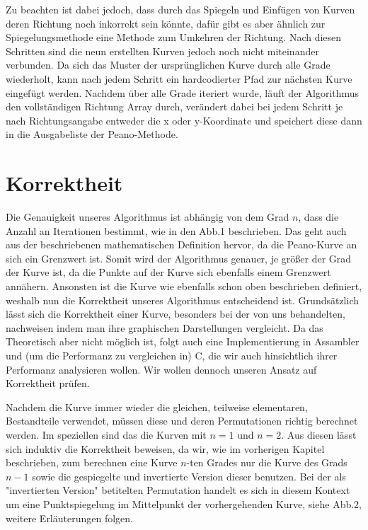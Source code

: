 \documentclass[course=asp]{aspdoc}
\begin{document}
Zu beachten ist dabei jedoch, dass durch das Spiegeln und Einfügen von Kurven deren Richtung noch inkorrekt sein könnte, dafür gibt es aber ähnlich zur Spiegelungsmethode eine Methode zum Umkehren der Richtung. Nach diesen Schritten sind die neun erstellten Kurven jedoch noch nicht miteinander verbunden. Da sich das Muster der ursprünglichen Kurve durch alle Grade wiederholt, kann nach jedem Schritt ein hardcodierter Pfad zur nächsten Kurve eingefügt werden.
Nachdem über alle Grade iteriert wurde, läuft der Algorithmus den vollständigen Richtung Array durch, verändert dabei bei jedem Schritt je nach Richtungsangabe entweder die x oder y-Koordinate und speichert diese dann in die Ausgabeliste der Peano-Methode.

\newpage

\section{Korrektheit} %

Die Genauigkeit unseres Algorithmus ist abhängig von dem Grad $n$, dass die Anzahl an Iterationen bestimmt, wie in den Abb.1 beschrieben. Das geht auch aus der beschriebenen mathematischen Definition hervor, da die Peano-Kurve an sich ein Grenzwert ist. Somit wird der Algorithmus genauer, je größer der Grad der Kurve ist, da die Punkte auf der Kurve sich ebenfalls einem Grenzwert annähern. Ansonsten ist die Kurve wie ebenfalls schon oben beschrieben definiert, weshalb nun die Korrektheit unseres Algorithmus entscheidend ist.
Grundsätzlich lässt sich die Korrektheit einer Kurve, besonders bei der von uns behandelten, nachweisen indem man ihre graphischen Darstellungen vergleicht. Da das Theoretisch aber nicht möglich ist, folgt auch eine Implementierung in Assambler und (um die Performanz zu vergleichen in) C, die wir auch hinsichtlich ihrer Performanz analysieren wollen.
Wir wollen dennoch unseren Ansatz auf Korrektheit prüfen.


Nachdem die Kurve immer wieder die gleichen, teilweise elementaren, Bestandteile verwendet, müssen diese und deren Permutationen richtig berechnet werden. Im speziellen sind das die Kurven mit $n = 1$ und $n = 2$. Aus diesen lässt sich induktiv die Korrektheit beweisen, da wir, wie im vorherigen Kapitel beschrieben, zum berechnen eine Kurve $n$-ten Grades nur die Kurve des Grads $n-1$ sowie die gespiegelte und invertierte Version dieser benutzen. Bei der als "invertierten Version" betitelten Permutation handelt es sich in diesem Kontext um eine Punktspiegelung im Mittelpunkt der vorhergehenden Kurve, siehe Abb.2, weitere Erläuterungen folgen.	%
\end{document}
